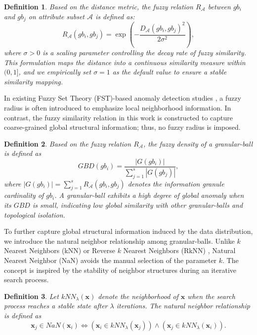 \documentclass[times, review, 10pt]{elsarticle}
\newtheorem{definition}{Definition}
\begin{document}
\begin{definition}
    Based on the distance metric, the fuzzy relation $R_{\mathcal{A}}$ between $gb_{i}$ and $gb_{j}$ on attribute subset $\mathcal{A}$ is defined as:
    \begin{equation}
        R_{\mathcal{A}}(gb_{i}, gb_{j}) = \exp\!\left(-\frac{D_{\mathcal{A}}(gb_{i}, gb_{j})^2}{2\sigma^2}\right),
    \end{equation}
    {where $\sigma>0$ is a scaling parameter controlling the decay rate of fuzzy similarity. This formulation maps the distance into a continuous similarity measure within $(0,1]$, and we empirically set $\sigma = 1$ as the default value to ensure a stable similarity mapping.}
\end{definition}

In existing Fuzzy Set Theory (FST)-based anomaly detection studies \cite{su2024detecting}, a fuzzy radius is often introduced to emphasize local neighborhood information. In contrast, the fuzzy similarity relation in this work is constructed to capture coarse-grained global structural information; thus, no fuzzy radius is imposed. 
\begin{definition}
Based on the fuzzy relation $R_{\mathcal{A}}$, the fuzzy density of a granular-ball is defined as
    \begin{equation}
    GBD(gb_i) = \frac{|G(gb_i)|}{\sum_{j=1}^{s}|G(gb_j)|},
    \label{eq:fuzzy density}
\end{equation}
where $|G(gb_i)| = \sum_{j=1}^{s} R_{\mathcal{A}}(gb_i, gb_j)$ denotes the information granule cardinality of $gb_i$. A granular-ball exhibits a high degree of global anomaly when its $GBD$ is small, indicating low global similarity with other granular-balls and topological isolation.
\end{definition}

To further capture global structural information induced by the data distribution, we introduce the natural neighbor relationship among granular-balls. Unlike $k$ Nearest Neighbors (kNN) \cite{stevens1951handbook} or Reverse $k$ Nearest Neighbors (RkNN) \cite{korn2000influence}, Natural Nearest Neighbor (NaN) \cite{zhu2016natural} avoids the manual selection of the parameter $k$. The concept is inspired by the stability of neighbor structures during an iterative search process.

\begin{definition}
Let $kNN_\lambda(\boldsymbol{x})$ denote the neighborhood of $\boldsymbol{x}$ when the search process reaches a stable state after $\lambda$ iterations. The natural neighbor relationship is defined as \cite{zhu2016natural}
\begin{equation}
    \boldsymbol{x}_j \in NaN(\boldsymbol{x}_i) \Leftrightarrow \left( \boldsymbol{x}_i \in kNN_\lambda(\boldsymbol{x}_j) \right) \land \left( \boldsymbol{x}_j \in kNN_\lambda(\boldsymbol{x}_i) \right).
\end{equation}
\end{definition}
\end{document}
